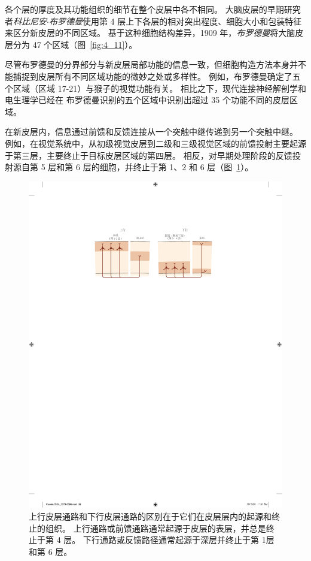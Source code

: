 各个层的厚度及其功能组织的细节在整个皮层中各不相同。 
大脑皮层的早期研究者\textit{科比尼安$\cdot$布罗德曼}使用第 4 层上下各层的相对突出程度、细胞大小和包装特征来区分新皮层的不同区域。 
基于这种细胞结构差异，1909 年，\textit{布罗德曼}将大脑皮层分为 47 个区域（图~\ref{fig:4_11}）。


尽管布罗德曼的分界部分与新皮层局部功能的信息一致，但细胞构造方法本身并不能捕捉到皮层所有不同区域功能的微妙之处或多样性。 
例如，布罗德曼确定了五个区域（区域 17-21）与猴子的视觉功能有关。 
相比之下，现代连接神经解剖学和电生理学已经在 布罗德曼识别的五个区域中识别出超过 35 个功能不同的皮层区域。


在新皮层内，信息通过前馈和反馈连接从一个突触中继传递到另一个突触中继。 
例如，在视觉系统中，从初级视觉皮层到二级和三级视觉区域的前馈投射主要起源于第三层，主要终止于目标皮层区域的第四层。 
相反，对早期处理阶段的反馈投射源自第 5 层和第 6 层的细胞，并终止于第 1、2 和 6 层（图~\ref{fig:4_12}）。

\begin{figure}[htbp]
	\centering
	\includegraphics[width=0.8\linewidth]{chap04/fig_4_12}
	\caption{上行皮层通路和下行皮层通路的区别在于它们在皮层层内的起源和终止的组织。
		上行通路或前馈通路通常起源于皮层的表层，并总是终止于第 4 层。
		下行通路或反馈路径通常起源于深层并终止于第 1层和第 6 层\cite{felleman1991distributed}。}
	\label{fig:4_12}
\end{figure}


